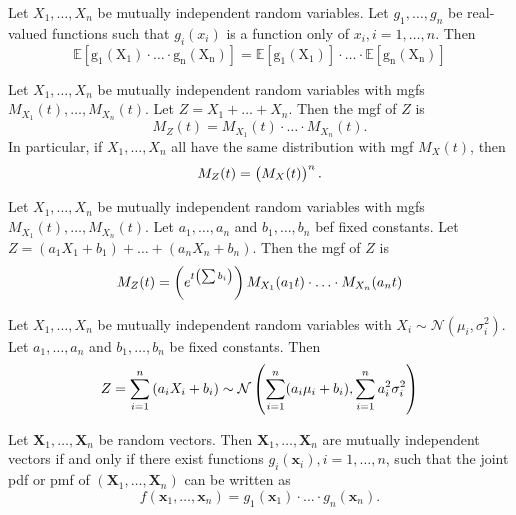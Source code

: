 \documentclass{article}
\theoremstyle{plain}
\newenvironment{theorem}[1]
      {\renewcommand\theinnertheorem{#1}\innertheorem}
      {\endinnertheorem}
\theoremstyle{definition}
\theoremstyle{plain}
\theoremstyle{plain}
\newenvironment{corollary}[1]
      {\renewcommand\theinnercorollary{#1}\innercorollary}
      {\endinnercorollary}
\renewcommand{\vec}[1]{\boldsymbol{#1}}
\newcommand{\E}[1]{\mathrm{\mathbb{E} \left[#1 \right]}}
\begin{document}
\begin{multicols}{2}
\begin{theorem}{4.6.6}[]
  Let $X_1, \ldots, X_n$ be mutually independent random variables.
  Let $g_1, \ldots, g_n$ be real-valued functions such that $g_i(x_i)$ is a function
  only of $x_i, i = 1, \ldots, n$.
  Then
  \begin{equation*}
    \E{g_1(X_1) \cdot \ldots \cdot g_n(X_n)}
    =
  \E{g_1(X_1)} \cdot \ldots \cdot \E{g_n(X_n)}
  \end{equation*}
\end{theorem}

\begin{theorem}{4.6.7}[]
  Let $X_1, \ldots, X_n$ be mutually independent random variables with mgfs
  $M_{X_1}(t), \ldots, M_{X_n}(t)$. Let $Z = X_1 + \ldots + X_n$.
  Then the mgf of $Z$ is
  \begin{equation*}
    M_Z(t) = M_{X_1}(t) \cdot \ldots \cdot M_{X_n}(t).
  \end{equation*}
  In particular, if $X_1, \ldots, X_n$ all have the same distribution with mgf
  $M_X(t)$, then
  \begin{equation*}
    M_Z(t) = \del{M_X(t)}^n.
  \end{equation*}
\end{theorem}

\begin{corollary}{4.6.9}[]
  Let $X_1, \ldots, X_n$ be mutually independent random variables with mgfs
  $M_{X_1}(t), \ldots, M_{X_n}(t)$. Let $a_1, \ldots, a_n$ and $b_1, \ldots, b_n$
  bef fixed constants. Let $Z = (a_1 X_1 + b_1) + \ldots + (a_n X_n + b_n)$.
  Then the mgf of $Z$ is
  \begin{equation*}
    M_Z(t) = \del{e^{t\del{\sum b_i}}} M_{X_1}(a_1 t) \cdot \ldots \cdot M_{X_n}(a_n t)
  \end{equation*}
\end{corollary}

\begin{corollary}{4.6.10}[]
  Let $X_1, \ldots, X_n$ be mutually independent random variables with
  $X_i \sim \mathcal{N}(\mu_i, \sigma_i^{2})$. Let $a_1, \ldots, a_n$
  and $b_1, \ldots, b_n$ be fixed constants. Then
  \begin{equation*}
    Z = \sum_{i = 1}^{n} \del{a_i X_i + b_i}
    \sim
    \mathcal{N}\del{
      \sum_{i = 1}^{n} (a_i \mu_i + b_i), \sum_{i = 1}^{n} a_i^{2} \sigma_i^{2}
    }
  \end{equation*}
\end{corollary}

\begin{theorem}{4.6.11}[]
  Let $\vec{X}_1, \ldots, \vec{X}_n$ be random vectors.
  Then $\vec{X}_1, \ldots, \vec{X}_n$ are mutually independent vectors if and only if
  there exist functions $g_i(\vec{x}_i), i = 1, \ldots, n$, such that the joint pdf or pmf of
  $(\vec{X}_1, \ldots, \vec{X}_n)$ can be written as
  \begin{equation*}
    f(\vec{x}_1, \ldots, \vec{x}_n) = g_1(\vec{x}_1) \cdot \ldots \cdot g_n(\vec{x}_n).
  \end{equation*}
\end{theorem}


\end{multicols}
\end{document}
